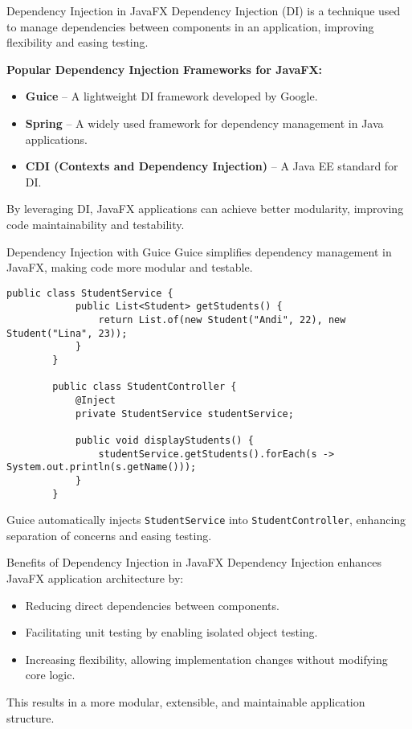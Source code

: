 \documentclass[aspectratio=169, table]{beamer}
\begin{document}
\begin{frame}[fragile]{Dependency Injection in JavaFX}
	\vspace{20pt}
	Dependency Injection (DI) is a technique used to manage dependencies between components  
	in an application, improving flexibility and easing testing.
	
	\bigskip
	\textbf{Popular Dependency Injection Frameworks for JavaFX:}
	\begin{itemize}
		\item \textbf{Guice} – A lightweight DI framework developed by Google.
		\item \textbf{Spring} – A widely used framework for dependency management in Java applications.
		\item \textbf{CDI (Contexts and Dependency Injection)} – A Java EE standard for DI.
	\end{itemize}
	
	\bigskip
	By leveraging DI, JavaFX applications can achieve better modularity,  
	improving code maintainability and testability.
\end{frame}



\begin{frame}[fragile]{Dependency Injection with Guice}
	\vspace{20pt}
	Guice simplifies dependency management in JavaFX, making code more modular and testable.
	
	\begin{lstlisting}[style=JavaStyle]
		public class StudentService {
			public List<Student> getStudents() {
				return List.of(new Student("Andi", 22), new Student("Lina", 23));
			}
		}
		
		public class StudentController {
			@Inject
			private StudentService studentService;
			
			public void displayStudents() {
				studentService.getStudents().forEach(s -> System.out.println(s.getName()));
			}
		}
	\end{lstlisting}
	
	Guice automatically injects \texttt{StudentService} into \texttt{StudentController},  
	enhancing separation of concerns and easing testing.
\end{frame}

\begin{frame}[fragile]{Benefits of Dependency Injection in JavaFX}
	\vspace{20pt}
	Dependency Injection enhances JavaFX application architecture by:
	\begin{itemize}
		\item Reducing direct dependencies between components.
		\item Facilitating unit testing by enabling isolated object testing.
		\item Increasing flexibility, allowing implementation changes  
		without modifying core logic.
	\end{itemize}
	
	This results in a more modular, extensible, and maintainable application structure.
\end{frame}
\end{document}
